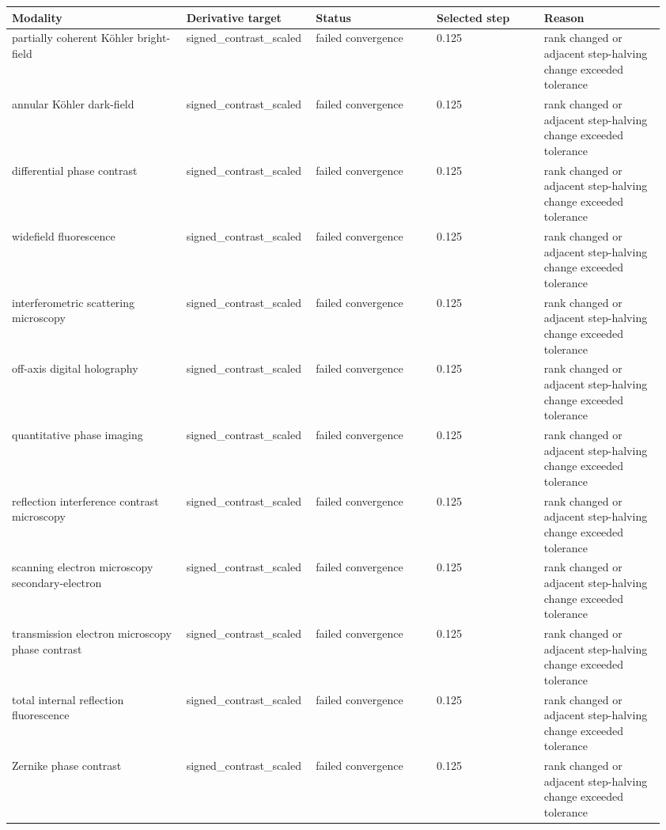 \begin{tabular}{p{0.26\linewidth}p{0.18\linewidth}p{0.18\linewidth}p{0.16\linewidth}p{0.18\linewidth}}
\toprule
Modality & Derivative target & Status & Selected step & Reason \\
\midrule
partially coherent Köhler bright-field & signed\_contrast\_scaled & failed convergence & 0.125 & rank changed or adjacent step-halving change exceeded tolerance \\
annular Köhler dark-field & signed\_contrast\_scaled & failed convergence & 0.125 & rank changed or adjacent step-halving change exceeded tolerance \\
differential phase contrast & signed\_contrast\_scaled & failed convergence & 0.125 & rank changed or adjacent step-halving change exceeded tolerance \\
widefield fluorescence & signed\_contrast\_scaled & failed convergence & 0.125 & rank changed or adjacent step-halving change exceeded tolerance \\
interfero\allowbreak{}metric scattering microscopy & signed\_contrast\_scaled & failed convergence & 0.125 & rank changed or adjacent step-halving change exceeded tolerance \\
off-axis digital holography & signed\_contrast\_scaled & failed convergence & 0.125 & rank changed or adjacent step-halving change exceeded tolerance \\
quantitative phase imaging & signed\_contrast\_scaled & failed convergence & 0.125 & rank changed or adjacent step-halving change exceeded tolerance \\
reflection interference contrast microscopy & signed\_contrast\_scaled & failed convergence & 0.125 & rank changed or adjacent step-halving change exceeded tolerance \\
scanning electron microscopy secondary-electron & signed\_contrast\_scaled & failed convergence & 0.125 & rank changed or adjacent step-halving change exceeded tolerance \\
transmission electron microscopy phase contrast & signed\_contrast\_scaled & failed convergence & 0.125 & rank changed or adjacent step-halving change exceeded tolerance \\
total internal reflection fluorescence & signed\_contrast\_scaled & failed convergence & 0.125 & rank changed or adjacent step-halving change exceeded tolerance \\
Zernike phase contrast & signed\_contrast\_scaled & failed convergence & 0.125 & rank changed or adjacent step-halving change exceeded tolerance \\
\bottomrule
\end{tabular}
